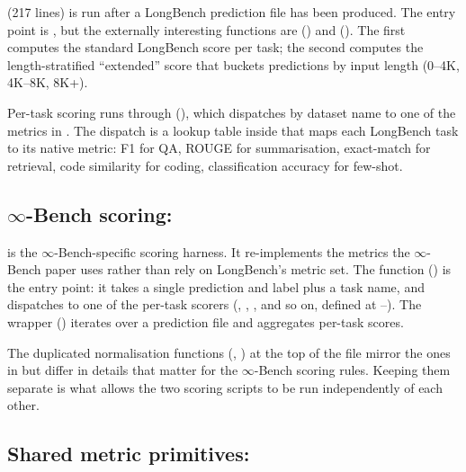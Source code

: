  (217 lines) is run after a LongBench prediction file has been produced. The entry point is , but the externally interesting functions are  () and  (). The first computes the standard LongBench score per task; the second computes the length-stratified ``extended'' score that buckets predictions by input length (0--4K, 4K--8K, 8K+).

Per-task scoring runs through  (), which dispatches by dataset name to one of the metrics in . The dispatch is a lookup table inside  that maps each LongBench task to its native metric: F1 for QA, ROUGE for summarisation, exact-match for retrieval, code similarity for coding, classification accuracy for few-shot.

\subsection{$\infty$-Bench scoring: }
\label{sec:bench-infbench}

 is the $\infty$-Bench-specific scoring harness. It re-implements the metrics the $\infty$-Bench paper uses rather than rely on LongBench's metric set. The function  () is the entry point: it takes a single prediction and label plus a task name, and dispatches to one of the per-task scorers (, , , and so on, defined at --). The wrapper  () iterates over a prediction file and aggregates per-task scores.

The duplicated normalisation functions (, ) at the top of the file mirror the ones in  but differ in details that matter for the $\infty$-Bench scoring rules. Keeping them separate is what allows the two scoring scripts to be run independently of each other.

\subsection{Shared metric primitives: }
\label{sec:bench-metrics}

